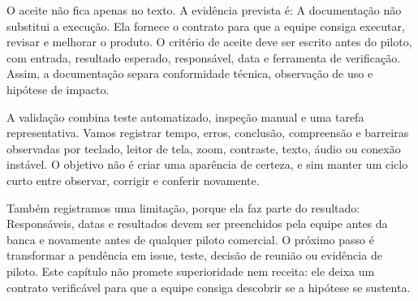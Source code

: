 \documentclass[12pt,oneside,a4paper,article]{abntex2}
\begin{document}
O aceite não fica apenas no texto. A evidência prevista é: A documentação não substitui a execução. Ela fornece o contrato para que a equipe consiga executar, revisar e melhorar o produto. O critério de aceite deve ser escrito antes do piloto, com entrada, resultado esperado, responsável, data e ferramenta de verificação. Assim, a documentação separa conformidade técnica, observação de uso e hipótese de impacto.

A validação combina teste automatizado, inspeção manual e uma tarefa representativa. Vamos registrar tempo, erros, conclusão, compreensão e barreiras observadas por teclado, leitor de tela, zoom, contraste, texto, áudio ou conexão instável. O objetivo não é criar uma aparência de certeza, e sim manter um ciclo curto entre observar, corrigir e conferir novamente.

Também registramos uma limitação, porque ela faz parte do resultado: Responsáveis, datas e resultados devem ser preenchidos pela equipe antes da banca e novamente antes de qualquer piloto comercial. O próximo passo é transformar a pendência em issue, teste, decisão de reunião ou evidência de piloto. Este capítulo não promete superioridade nem receita: ele deixa um contrato verificável para que a equipe consiga descobrir se a hipótese se sustenta.


\end{document}
